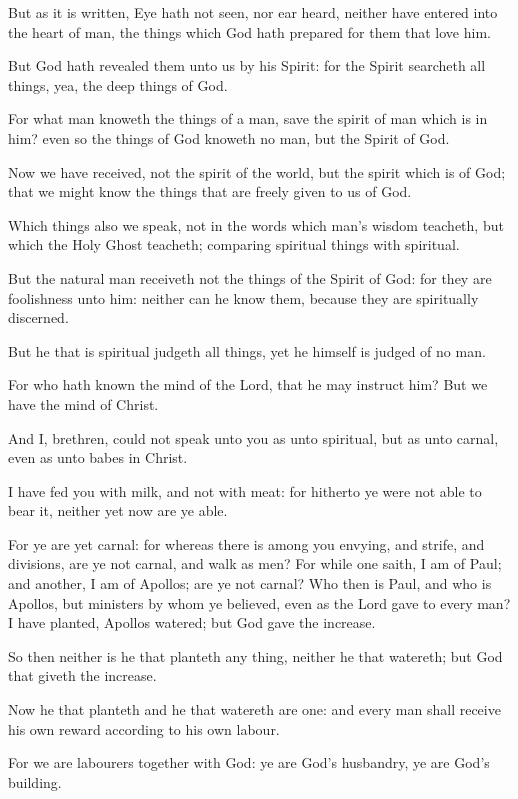 \Verse But as it is written, Eye hath not seen, nor ear heard, neither have entered into the heart of man, the things which God hath prepared for them that love him.

\Verse But God hath revealed them unto us by his Spirit: for the Spirit searcheth all things, yea, the deep things of God.

\Verse For what man knoweth the things of a man, save the spirit of man which is in him? even so the things of God knoweth no man, but the Spirit of God.

\Verse Now we have received, not the spirit of the world, but the spirit which is of God; that we might know the things that are freely given to us of God.

\Verse Which things also we speak, not in the words which man's wisdom teacheth, but which the Holy Ghost teacheth; comparing spiritual things with spiritual.

\Verse But the natural man receiveth not the things of the Spirit of God: for they are foolishness unto him: neither can he know them, because they are spiritually discerned.

\Verse But he that is spiritual judgeth all things, yet he himself is judged of no man.

\Verse For who hath known the mind of the Lord, that he may instruct him?  But we have the mind of Christ.


\Chapter
\Verse And I, brethren, could not speak unto you as unto spiritual, but as unto carnal, even as unto babes in Christ.

\Verse I have fed you with milk, and not with meat: for hitherto ye were not able to bear it, neither yet now are ye able.

\Verse For ye are yet carnal: for whereas there is among you envying, and strife, and divisions, are ye not carnal, and walk as men?  \Verse For while one saith, I am of Paul; and another, I am of Apollos; are ye not carnal?  \Verse Who then is Paul, and who is Apollos, but ministers by whom ye believed, even as the Lord gave to every man?  \Verse I have planted, Apollos watered; but God gave the increase.

\Verse So then neither is he that planteth any thing, neither he that watereth; but God that giveth the increase.

\Verse Now he that planteth and he that watereth are one: and every man shall receive his own reward according to his own labour.

\Verse For we are labourers together with God: ye are God's husbandry, ye are God's building.

